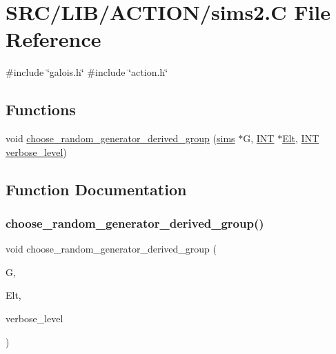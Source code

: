 \hypertarget{sims2_8_c}{}\section{S\+R\+C/\+L\+I\+B/\+A\+C\+T\+I\+O\+N/sims2.C File Reference}
\label{sims2_8_c}
{\ttfamily \#include \char`\"{}galois.\+h\char`\"{}}\newline
{\ttfamily \#include \char`\"{}action.\+h\char`\"{}}\newline
\subsection*{Functions}
\begin{DoxyCompactItemize}
\item 
void \mbox{\hyperlink{sims2_8_c_a5b8d821b5043492735a34157796367e9}{choose\+\_\+random\+\_\+generator\+\_\+derived\+\_\+group}} (\mbox{\hyperlink{classsims}{sims}} $\ast$G, \mbox{\hyperlink{galois_8h_a09fddde158a3a20bd2dcadb609de11dc}{I\+NT}} $\ast$\mbox{\hyperlink{simeon_8_c_aec1406935bdb1fee3561fcb840964100}{Elt}}, \mbox{\hyperlink{galois_8h_a09fddde158a3a20bd2dcadb609de11dc}{I\+NT}} \mbox{\hyperlink{simeon_8_c_a818073fbcc2f439e7c56952f67386122}{verbose\+\_\+level}})
\end{DoxyCompactItemize}


\subsection{Function Documentation}
\mbox{\label{sims2_8_c_a5b8d821b5043492735a34157796367e9}} 
\subsubsection{\texorpdfstring{choose\+\_\+random\+\_\+generator\+\_\+derived\+\_\+group()}{choose\_random\_generator\_derived\_group()}}
{\footnotesize\ttfamily void choose\+\_\+random\+\_\+generator\+\_\+derived\+\_\+group (\begin{DoxyParamCaption}\item[{\mbox{\hyperlink{classsims}{sims}} $\ast$}]{G,  }\item[{\mbox{\hyperlink{galois_8h_a09fddde158a3a20bd2dcadb609de11dc}{I\+NT}} $\ast$}]{Elt,  }\item[{\mbox{\hyperlink{galois_8h_a09fddde158a3a20bd2dcadb609de11dc}{I\+NT}}}]{verbose\+\_\+level }\end{DoxyParamCaption})}

